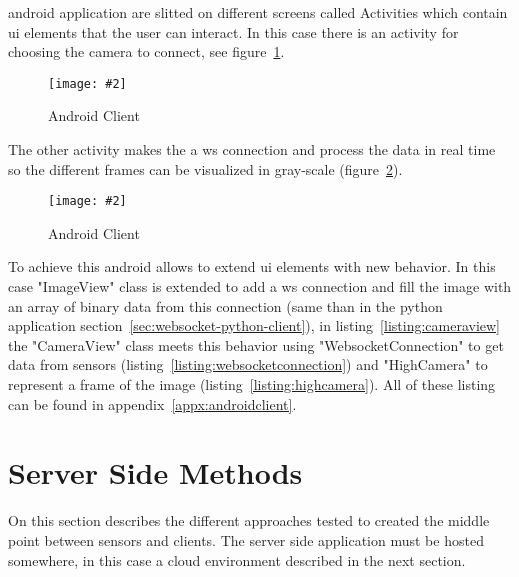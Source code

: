 \documentclass[hidelinks,11pt,a4paper,oneside,article]{memoir}
\newcommand{\putimage}[3][10] %
{
\begin{figure}[h]
	\centering
	\captionsetup{justification=centering}
	\texttt{[image: \#2]}
	\caption{#3}
	\label{fig:#2}
\end{figure}
}
\begin{document}
\gls{android} application are slitted on different screens called Activities which contain \gls{ui} elements that the user can interact. In this case there is an activity for choosing the camera to connect, see figure~\ref{fig:android-client}.

    \putimage[4]{android-client}{Android Client}

The other activity makes the a \gls{ws} connection and process the data in real time so the different frames can be visualized in gray-scale (figure~\ref{fig:android-client2}).

    \putimage[4]{android-client2}{Android Client}

To achieve this \gls{android} allows to extend \gls{ui} elements with new behavior. In this case "ImageView" class is extended to add a \gls{ws} connection and fill the image with an array of binary data from this connection (same than in the python application section~\ref{sec:websocket-python-client}), in listing~\ref{listing:cameraview} the "CameraView" class meets this behavior using "WebsocketConnection" to get data from sensors (listing~\ref{listing:websocketconnection}) and "HighCamera" to represent a frame of the image (listing~\ref{listing:highcamera}). All of these listing can be found in appendix~\ref{appx:androidclient}.

\section{Server Side Methods}\label{sec:server-side-methods} 
On this section describes the different approaches tested to created the middle point between sensors and clients. The server side application must be hosted somewhere, in this case a cloud environment described in the next section.
\end{document}
